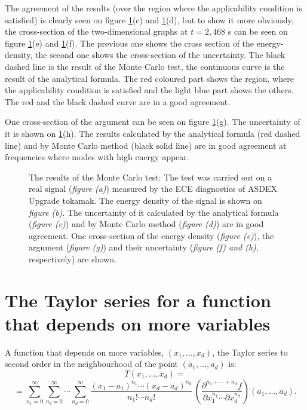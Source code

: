 \documentclass[a4paper,12pt,oneside]{article}
\begin{document}
The agreement of the results (over the region where the applicability condition is satisfied) is clearly seen on figure \ref{fig:gauss_error_test}(c) and \ref{fig:gauss_error_test}(d), but to show it more obviously, the cross-section of the two-dimensional graphs at $t = 2,468$ s can be seen on figure \ref{fig:gauss_error_test}(e) and \ref{fig:gauss_error_test}(f). The previous one shows the cross section of the energy-density, the second one shows the cross-section of the uncertainty. The black dashed line is the result of the Monte Carlo test, the continuous curve is the result of the analytical formula. The red coloured part shows the region, where the applicability condition is satisfied and the light blue part shows the others. The red and the black dashed curve are in a good agreement.

One cross-section of the argument can be seen on figure \ref{fig:gauss_error_test}(g). The uncertainty of it is shown on \ref{fig:gauss_error_test}(h). The results calculated by the analytical formula (red dashed line) and by Monte Carlo method (black solid line) are in good agreement at frequencies where modes with high energy appear.

\begin{figure}[htb!]
  \centerline{}
  \caption{\label{fig:gauss_error_test}The results of the Monte Carlo test: The test was carried out on a real signal (\textit{figure (a)}) measured by the ECE diagnostics of ASDEX Upgrade tokamak. The energy density of the signal is shown on \textit{figure (b)}. The uncertainty of it calculated by the analytical formula (\textit{figure (c)}) and by Monte Carlo method (\textit{figure (d)}) are in good agreement. One cross-section of the energy density (\textit{figure (e)}), the argument (\textit{figure (g)}) and their uncertainty (\textit{figure (f) and (h)}, respectively) are shown.}
\end{figure}



\clearpage

\appendix
\section{The Taylor series for a function that depends on more variables}
A function that depends on more variables, $(x_1,\dots,x_d)$, the Taylor series to second order in the neighbourhood of the point $(a_1,\dots,a_d)$ is:
$$T(x_1,\dots,x_d) = $$
$$=\sum_{n_1=0}^\infty \sum_{n_2=0}^\infty \cdots \sum_{n_d = 0}^\infty 
\frac{(x_1-a_1)^{n_1}\cdots (x_d-a_d)^{n_d}}{n_1!\cdots n_d!}\,\left(\frac{\partial^{n_1 + \cdots + n_d}f}{\partial x_1^{n_1}\cdots \partial x_d^{n_d}}\right)(a_1,\dots,a_d).\!$$



\end{document}
